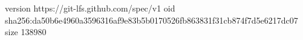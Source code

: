 version https://git-lfs.github.com/spec/v1
oid sha256:da50b6e4960a3596316af9e83b5b0170526fb863831f31cb874f7d5e6217dc07
size 138980
